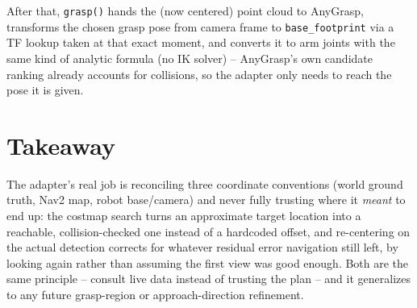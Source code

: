 \documentclass[11pt]{article}
\begin{document}
After that, \texttt{grasp()} hands the (now centered) point cloud to AnyGrasp,
transforms the chosen grasp pose from camera frame to \texttt{base\_footprint} via a
TF lookup taken at that exact moment, and converts it to arm joints with the same kind
of analytic formula (no IK solver) -- AnyGrasp's own candidate ranking already
accounts for collisions, so the adapter only needs to reach the pose it is given.

\section*{Takeaway}

The adapter's real job is reconciling three coordinate conventions (world ground
truth, Nav2 map, robot base/camera) and never fully trusting where it \emph{meant} to
end up: the costmap search turns an approximate target location into a reachable,
collision-checked one instead of a hardcoded offset, and re-centering on the actual
detection corrects for whatever residual error navigation still left, by looking
again rather than assuming the first view was good enough. Both are the same
principle -- consult live data instead of trusting the plan -- and it generalizes to
any future grasp-region or approach-direction refinement.
\end{document}
